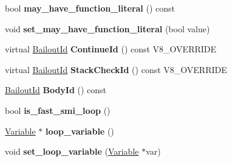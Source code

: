 \begin{DoxyCompactItemize}
\item 
\hypertarget{classv8_1_1internal_1_1_v8___f_i_n_a_l_af18dd1195f8159d74a7a1f1aa241c22e}{}bool {\bfseries may\+\_\+have\+\_\+function\+\_\+literal} () const \label{classv8_1_1internal_1_1_v8___f_i_n_a_l_af18dd1195f8159d74a7a1f1aa241c22e}

\item 
\hypertarget{classv8_1_1internal_1_1_v8___f_i_n_a_l_adb86680b90ac3ed1c89e16639b1a7e24}{}void {\bfseries set\+\_\+may\+\_\+have\+\_\+function\+\_\+literal} (bool value)\label{classv8_1_1internal_1_1_v8___f_i_n_a_l_adb86680b90ac3ed1c89e16639b1a7e24}

\item 
\hypertarget{classv8_1_1internal_1_1_v8___f_i_n_a_l_a90b5e273e8b8f7894751af55a67b2be4}{}virtual \hyperlink{classv8_1_1internal_1_1_bailout_id}{Bailout\+Id} {\bfseries Continue\+Id} () const V8\+\_\+\+O\+V\+E\+R\+R\+I\+D\+E\label{classv8_1_1internal_1_1_v8___f_i_n_a_l_a90b5e273e8b8f7894751af55a67b2be4}

\item 
\hypertarget{classv8_1_1internal_1_1_v8___f_i_n_a_l_a990170f24ee26a29557d05605ccb92d8}{}virtual \hyperlink{classv8_1_1internal_1_1_bailout_id}{Bailout\+Id} {\bfseries Stack\+Check\+Id} () const V8\+\_\+\+O\+V\+E\+R\+R\+I\+D\+E\label{classv8_1_1internal_1_1_v8___f_i_n_a_l_a990170f24ee26a29557d05605ccb92d8}

\item 
\hypertarget{classv8_1_1internal_1_1_v8___f_i_n_a_l_a2fec0b05981577d54664b461a42deaac}{}\hyperlink{classv8_1_1internal_1_1_bailout_id}{Bailout\+Id} {\bfseries Body\+Id} () const \label{classv8_1_1internal_1_1_v8___f_i_n_a_l_a2fec0b05981577d54664b461a42deaac}

\item 
\hypertarget{classv8_1_1internal_1_1_v8___f_i_n_a_l_aa3140fcdbb3f1e306faf2e201d091cf8}{}bool {\bfseries is\+\_\+fast\+\_\+smi\+\_\+loop} ()\label{classv8_1_1internal_1_1_v8___f_i_n_a_l_aa3140fcdbb3f1e306faf2e201d091cf8}

\item 
\hypertarget{classv8_1_1internal_1_1_v8___f_i_n_a_l_a32ec684e8866038e616753a16dd394bf}{}\hyperlink{classv8_1_1internal_1_1_variable}{Variable} $\ast$ {\bfseries loop\+\_\+variable} ()\label{classv8_1_1internal_1_1_v8___f_i_n_a_l_a32ec684e8866038e616753a16dd394bf}

\item 
\hypertarget{classv8_1_1internal_1_1_v8___f_i_n_a_l_a35ae1a974e306fdadf253519e41a7b9e}{}void {\bfseries set\+\_\+loop\+\_\+variable} (\hyperlink{classv8_1_1internal_1_1_variable}{Variable} $\ast$var)\label{classv8_1_1internal_1_1_v8___f_i_n_a_l_a35ae1a974e306fdadf253519e41a7b9e}


\end{DoxyCompactItemize}
